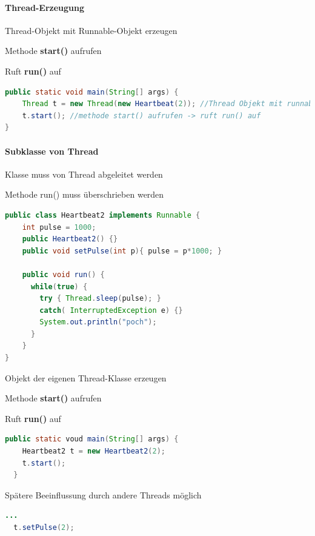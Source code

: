 \documentclass[10pt]{article}
\begin{document}
  \paragraph{Thread-Erzeugung}
  
  \begin{itemize*}
    \item Thread-Objekt mit Runnable-Objekt erzeugen
    \item Methode \textbf{start()} aufrufen
    \begin{itemize*}
      \item Ruft \textbf{run()} auf
    \end{itemize*}
  \end{itemize*}
  \begin{lstlisting}[language=java]
public static void main(String[] args) {
    Thread t = new Thread(new Heartbeat(2)); //Thread Objekt mit runnable erzeugen
    t.start(); //methode start() aufrufen -> ruft run() auf
}
\end{lstlisting}
  
  \paragraph{Subklasse von Thread}
  
  \begin{itemize*}
    \item Klasse muss von Thread abgeleitet werden
    \item Methode run() muss überschrieben werden
  \end{itemize*}
  \begin{lstlisting}[language=java]
public class Heartbeat2 implements Runnable {
    int pulse = 1000;
    public Heartbeat2() {}
    public void setPulse(int p){ pulse = p*1000; }

    public void run() {
      while(true) {
        try { Thread.sleep(pulse); }
        catch( InterruptedException e) {}
        System.out.println("poch");
      }
    }
}
\end{lstlisting}
  
  \begin{itemize*}
    \item Objekt der eigenen Thread-Klasse erzeugen
    \item Methode \textbf{start()} aufrufen
    \begin{itemize*}
      \item Ruft \textbf{run()} auf
    \end{itemize*}
    \begin{lstlisting}[language=java]
  public static voud main(String[] args) {
    Heartbeat2 t = new Heartbeat2(2);
    t.start();
  }
  \end{lstlisting}
    \item Spätere Beeinflussung durch andere Threads möglich
    \begin{lstlisting}[language=java]
  ...
  t.setPulse(2);
  \end{lstlisting}
  \end{itemize*}
  
\end{document}
